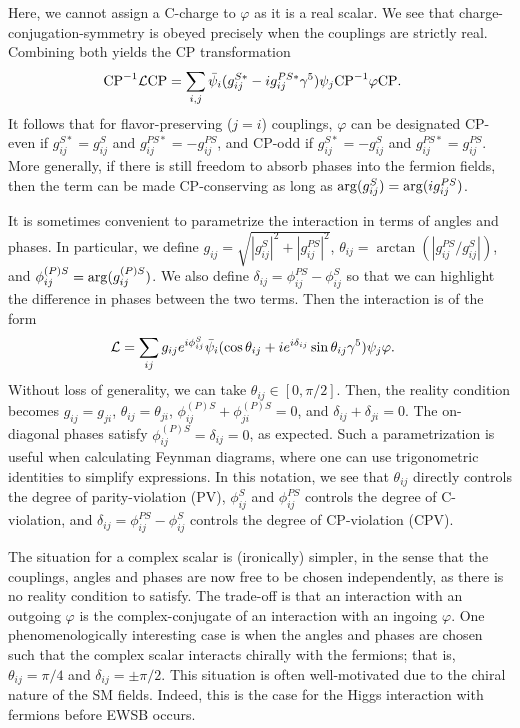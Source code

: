 Here, we cannot assign a C-charge to $\varphi$ as it is a real scalar. We see that charge-conjugation-symmetry is obeyed precisely when the couplings are strictly real. Combining both yields the CP transformation
\begin{align}
    {\rm CP}^{-1}{\cal L}{\rm CP} 
    &= \sum_{i,j}\bar{\psi}_i(g_{ij}^{S*} - ig_{ij}^{PS*}\gamma^5)\psi_j {\rm CP}^{-1}\varphi{\rm CP}.
\end{align}
It follows that for flavor-preserving ($j = i$) couplings, $\varphi$ can be designated CP-even if $g_{ij}^{S*} = g_{ij}^S$ and $g_{ij}^{PS*} = -g_{ij}^{PS}$, and CP-odd if $g_{ij}^{S*} = -g_{ij}^{S}$ and $g_{ij}^{PS*} = g_{ij}^{PS}$. More generally, if there is still freedom to absorb phases into the fermion fields, then the term can be made CP-conserving as long as ${\rm arg}(g_{ij}^{S}) = {\rm arg}(ig_{ij}^{PS})$.

It is sometimes convenient to parametrize the interaction in terms of angles and phases. In particular, we define $g_{ij} = \sqrt{|g_{ij}^S|^2 + |g_{ij}^{PS}|^2}$, $\theta_{ij} = \arctan(|g_{ij}^{PS}/g_{ij}^S|)$, and $\phi_{ij}^{(P)S} ={\rm arg}(g_{ij}^{(P)S})$. We also define $\delta_{ij} = \phi_{ij}^{PS} - \phi_{ij}^S$ so that we can highlight the difference in phases between the two terms. Then the interaction is of the form
\begin{align}
    {\cal L} &= \sum_{ij}g_{ij}e^{i\phi_{ij}^S}\bar{\psi}_i(\cos{\theta_{ij}} + ie^{i\delta_{ij}}\sin{\theta_{ij}}\gamma^5)\psi_j \varphi.
\end{align}
Without loss of generality, we can take $\theta_{ij} \in [0, \pi/2]$. Then, the reality condition becomes $g_{ij} = g_{ji}$, $\theta_{ij} = \theta_{ji}$, $\phi_{ij}^{(P)S} + \phi_{ji}^{(P)S} = 0$, and $\delta_{ij} + \delta_{ji} = 0$. The on-diagonal phases satisfy $\phi_{ij}^{(P)S} = \delta_{ij} = 0$, as expected. Such a parametrization is useful when calculating Feynman diagrams,  where one can use trigonometric identities to simplify expressions. In this notation, we see that $\theta_{ij}$ directly controls the degree of parity-violation (PV), $\phi_{ij}^S$ and $\phi_{ij}^{PS}$ controls the degree of C-violation, and $\delta_{ij} = \phi_{ij}^{PS} - \phi_{ij}^{S}$ controls the degree of CP-violation (CPV). 

The situation for a complex scalar is (ironically) simpler, in the sense that the couplings, angles and phases are now free to be chosen independently, as there is no reality condition to satisfy. The trade-off is that an interaction with an outgoing $\varphi$ is the complex-conjugate of an interaction with an ingoing $\varphi$. One phenomenologically interesting case is when the angles and phases are chosen such that the complex scalar interacts chirally with the fermions; that is, $\theta_{ij} = \pi/4$ and $\delta_{ij} = \pm \pi/2$. This situation is often well-motivated due to the chiral nature of the SM fields. Indeed, this is the case for the Higgs interaction with fermions before EWSB occurs. 


